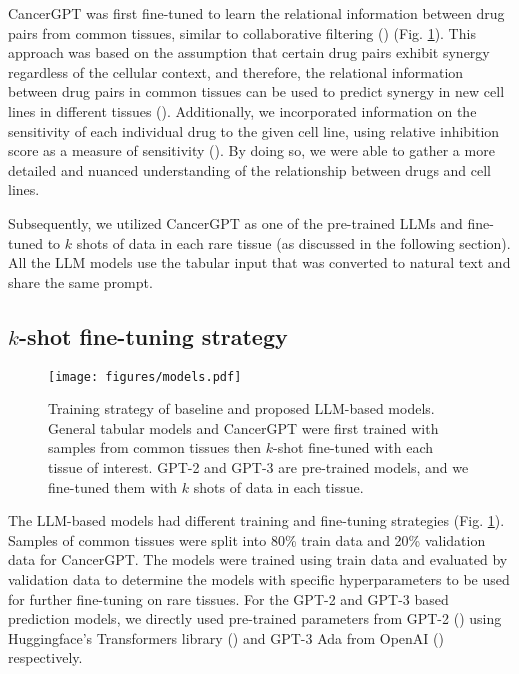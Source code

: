 CancerGPT was first fine-tuned to learn the relational information between drug pairs from common tissues, similar to collaborative filtering (\cite{10.1093/bioinformatics/bty452}) (Fig. \ref{fig:models}). This approach was based on the assumption that certain drug pairs exhibit synergy regardless of the cellular context, and therefore, the relational information between drug pairs in common tissues can be used to predict synergy in new cell lines in different tissues (\cite{hosseini_ccsynergy_2023}). Additionally, we incorporated information on the sensitivity of each individual drug to the given cell line, using relative inhibition score as a measure of sensitivity (\cite{10.1093/nar/gkab438}). By doing so, we were able to gather a more detailed and nuanced understanding of the relationship between drugs and cell lines.

Subsequently, we utilized CancerGPT as one of the pre-trained LLMs and fine-tuned to $k$ shots of data in each rare tissue (as discussed in the following section). All the LLM models use the tabular input that was converted to natural text and share the same prompt.

\subsection{$k$-shot fine-tuning strategy}
\label{sec:k_shot}

\begin{figure}[t]
  \centering 
  \texttt{[image: figures/models.pdf]}
  \caption{Training strategy of baseline and proposed LLM-based models. General tabular models and CancerGPT were first trained with samples from common tissues then $k$-shot fine-tuned with each tissue of interest. GPT-2 and GPT-3 are pre-trained models, and we fine-tuned them with $k$ shots of data in each tissue.}
  \label{fig:models} 
\end{figure}

The LLM-based models had different training and fine-tuning strategies (Fig. \ref{fig:models}). Samples of common tissues were split into 80\% train data and 20\% validation data for CancerGPT. The models were trained using train data and evaluated by validation data to determine the models with specific hyperparameters to be used for further fine-tuning on rare tissues. For the GPT-2 and GPT-3 based prediction models, we directly used pre-trained parameters from GPT-2 (\cite{radford_language_nodate}) using Huggingface’s Transformers library (\cite{wolf2020huggingfaces}) and GPT-3 Ada from OpenAI (\cite{brown_language_2020}) respectively.

